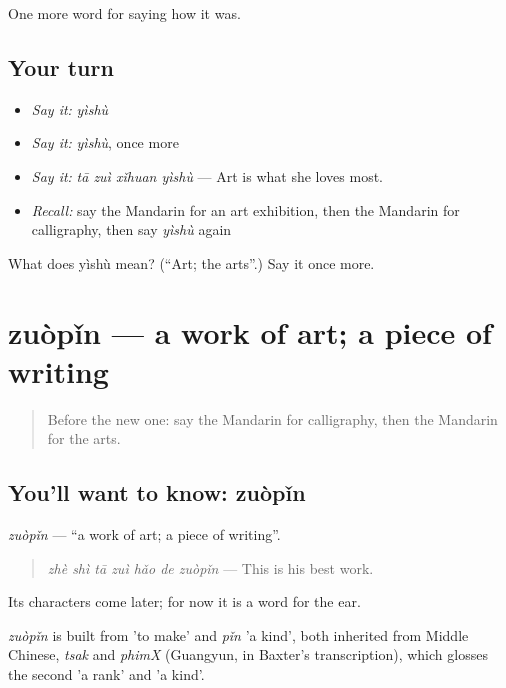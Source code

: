 \begin{grammarlens}[title={What you've built}]
One more word for saying how it was.
\end{grammarlens}

\subsection*{Your turn}
\begin{itemize}
\raggedright
  \item \emph{Say it:} \emph{yìshù}
  \item \emph{Say it:} \emph{yìshù}, once more
  \item \emph{Say it:} \emph{tā zuì xǐhuan yìshù} — Art is what she loves most.
  \item \emph{Recall:} say the Mandarin for an art exhibition, then the Mandarin for calligraphy, then say \emph{yìshù} again
\end{itemize}

\begin{tcolorbox}[breakable,colback=teal!4,colframe=teal!35!black,title={Before you move on}]
What does yìshù mean? (\textquotedblleft{}Art; the arts\textquotedblright{}.) Say it once more.
\end{tcolorbox}
\section[zuòpǐn]{zuòpǐn — a work of art; a piece of writing}

\label{lesson:ZH-C503-zuopin}



\begin{quote}
Before the new one: say the Mandarin for calligraphy, then the Mandarin for the arts.
\end{quote}

\subsection*{You'll want to know: zuòpǐn}
\emph{zuòpǐn} — \textquotedblleft{}a work of art; a piece of writing\textquotedblright{}.

\begin{quote}
\emph{zhè shì tā zuì hǎo de zuòpǐn} — This is his best work.
\end{quote}

Its characters come later; for now it is a word for the ear.

\begin{cousinweb}
\emph{zuòpǐn} is built from  'to make' and \emph{pǐn} 'a kind', both inherited from Middle Chinese, \emph{tsak} and \emph{phimX} (Guangyun, in Baxter's transcription), which glosses the second 'a rank' and 'a kind'.
\end{cousinweb}

